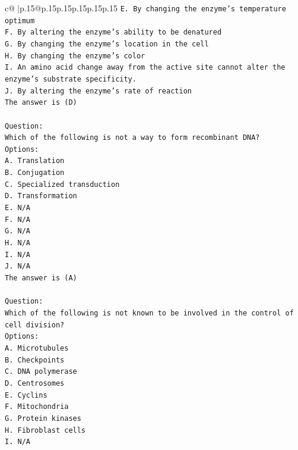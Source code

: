 \documentclass{article}
\begin{document}
{\begin{supertabular}{c@{$\;$}|p{.15\linewidth}@{}p{.15\linewidth}p{.15\linewidth}p{.15\linewidth}p{.15\linewidth}p{.15\linewidth}}
{{{\texttt{E. By changing the enzyme's temperature optimum} \\
\texttt{F. By altering the enzyme's ability to be denatured} \\
\texttt{G. By changing the enzyme’s location in the cell} \\
\texttt{H. By changing the enzyme's color} \\
\texttt{I. An amino acid change away from the active site cannot alter the enzyme’s substrate specificity.} \\
\texttt{J. By altering the enzyme's rate of reaction} \\
\texttt{The answer is (D)} \\
\\ 
\texttt{Question:} \\
\texttt{Which of the following is not a way to form recombinant DNA?} \\
\texttt{Options:} \\
\texttt{A. Translation} \\
\texttt{B. Conjugation} \\
\texttt{C. Specialized transduction} \\
\texttt{D. Transformation} \\
\texttt{E. N/A} \\
\texttt{F. N/A} \\
\texttt{G. N/A} \\
\texttt{H. N/A} \\
\texttt{I. N/A} \\
\texttt{J. N/A} \\
\texttt{The answer is (A)} \\
\\ 
\texttt{Question:} \\
\texttt{Which of the following is not known to be involved in the control of cell division?} \\
\texttt{Options:} \\
\texttt{A. Microtubules} \\
\texttt{B. Checkpoints} \\
\texttt{C. DNA polymerase} \\
\texttt{D. Centrosomes} \\
\texttt{E. Cyclins} \\
\texttt{F. Mitochondria} \\
\texttt{G. Protein kinases} \\
\texttt{H. Fibroblast cells} \\
\texttt{I. N/A} \\
}}}
\end{supertabular}}
\end{document}
